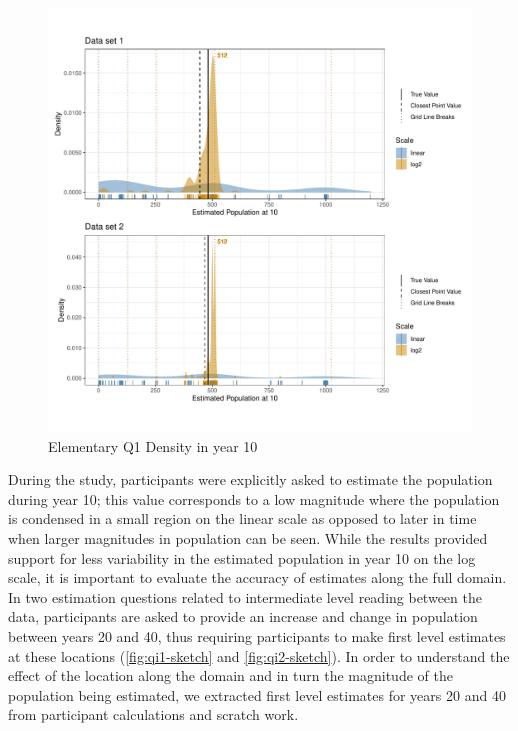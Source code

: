 \documentclass[print]{nuthesis}
\begin{document}
\begin{figure}[tbp]

{\centering \includegraphics[width=1\linewidth,]{thesis_files/figure-latex/qe1-density-plot-10-all-1} 

}

\caption{Elementary Q1 Density in year 10}\label{fig:qe1-density-plot-10-all}
\end{figure}

During the study, participants were explicitly asked to estimate the population during year 10; this value corresponds to a low magnitude where the population is condensed in a small region on the linear scale as opposed to later in time when larger magnitudes in population can be seen.
While the results provided support for less variability in the estimated population in year 10 on the log scale, it is important to evaluate the accuracy of estimates along the full domain.
In two estimation questions related to intermediate level reading between the data, participants are asked to provide an increase and change in population between years 20 and 40, thus requiring participants to make first level estimates at these locations (\cref{fig:qi1-sketch} and \cref{fig:qi2-sketch}).
In order to understand the effect of the location along the domain and in turn the magnitude of the population being estimated, we extracted first level estimates for years 20 and 40 from participant calculations and scratch work.
\end{document}
